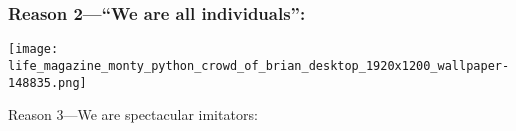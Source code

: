 \begin{frame}

  \frametitle{Reason 2---``We are all individuals'':}

  \texttt{[image: life\_magazine\_monty\_python\_crowd\_of\_brian\_desktop\_1920x1200\_wallpaper-148835.png]}



\end{frame}


\begin{frame}

  \begin{block}{Reason 3---We are spectacular imitators:}
  \end{block}

  \bigskip

  {\small {}}

\end{frame}


